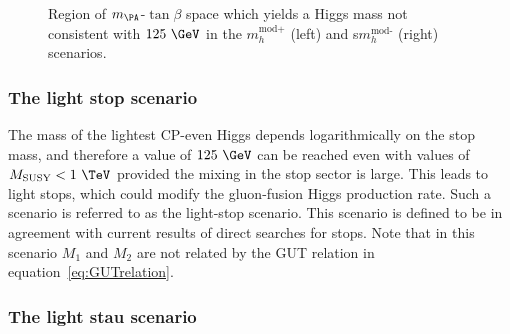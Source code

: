 \begin{figure}[htbp]
\caption{Region of $m_{\PA}$-$\tan\beta$ space which yields a Higgs mass not
consistent with $125~\GeV$ in the $m_{h}^{\text{mod+}}$ (left) and
s$m_{h}^{\text{mod-}}$ (right) scenarios.}
\label{fig:mhmodmass}
\end{figure}

\subsubsection{The light stop scenario}
\label{sec:lightstopscenario}

The mass of the lightest CP-even Higgs depends logarithmically on the stop mass,
and therefore a value of $125~\GeV$ can be reached even with values of
$M_{\text{SUSY}} < 1~\TeV$ provided the mixing in the stop sector is large. This
leads to light stops, which could modify the gluon-fusion Higgs production rate.
Such a scenario is referred to as the light-stop scenario. This scenario is
defined to be in agreement with current results of direct searches for stops.
Note that in this scenario $M_{1}$ and $M_{2}$ are not related by the GUT
relation in equation~\ref{eq:GUTrelation}. 

\subsubsection{The light stau scenario}
\label{sec:lightstauscenario}

